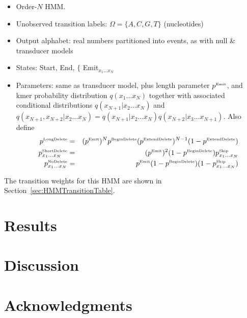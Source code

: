 \documentclass[10pt]{article}
\newcommand{\secref}[1]{Section~\ref{sec:#1}}
\begin{document}
\begin{itemize}
\item Order-$N$ HMM.
\item Unobserved transition labels: $\Omega = \{ A, C, G, T \}$ (nucleotides)
\item Output alphabet: real numbers partitioned into events, as with null \& transducer models
\item States: Start, End, $\{$ Emit${}_{x_1 \ldots x_N}$
\item Parameters: same as transducer model, plus length parameter $p^{\mbox{\tiny Emit}}$,
and kmer probability distribution
  $q(x_1\ldots x_N)$
together with associated conditional distributions
  $q(x_{N+1}|x_2\ldots x_N)$
and
  $q(x_{N+1},x_{N+2}|x_2\ldots x_N) = q(x_{N+1}|x_2\ldots x_N) q(x_{N+2}|x_3\ldots x_{N+1})$.
Also define
\begin{eqnarray*}
p^{\mbox{\tiny LongDelete}}
& = & (p^{\mbox{\tiny Emit}})^N p^{\mbox{\tiny BeginDelete}} (p^{\mbox{\tiny ExtendDelete}})^{N-1} (1 - p^{\mbox{\tiny ExtendDelete}})
\\
p^{\mbox{\tiny ShortDelete}}_{x_1\ldots x_N}
& = & (p^{\mbox{\tiny Emit}})^2 (1 - p^{\mbox{\tiny BeginDelete}}) p^{\mbox{\tiny Skip}}_{x_1\ldots x_N}
\\
p^{\mbox{\tiny NoDelete}}_{x_1\ldots x_N}
& = & p^{\mbox{\tiny Emit}} (1 - p^{\mbox{\tiny BeginDelete}}) (1 - p^{\mbox{\tiny Skip}}_{x_1\ldots x_N})
\end{eqnarray*}
\end{itemize}

The transition weights for this HMM are shown in \secref{HMMTransitionTable}.


\newpage
\section{Results}




\section{Discussion}


\newpage
\section{Acknowledgments}


\end{document}
